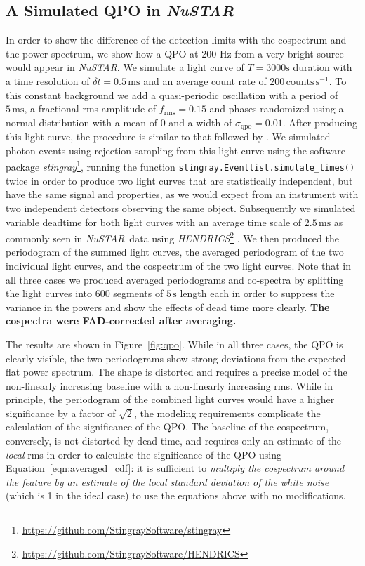 \documentclass[12pt]{emulateapj}
\newcommand{\project}[1]{\textsl{#1}}
\newcommand{\nustar}{\project{NuSTAR}\xspace}
\begin{document}
\subsection{A Simulated QPO in \nustar}

In order to show the difference of the detection limits with the cospectrum and the power spectrum, we show how a QPO at 200 Hz from a very bright source would appear in \nustar. 
We simulate a light curve of $T=3000\mathrm{s}$ duration with a time resolution of $\delta t = 0.5 \,\mathrm{ms}$ and an average count rate of $200 \,\mathrm{counts}\,\mathrm{s}^{-1}$. To this constant background we add a quasi-periodic oscillation with a period of $5\,\mathrm{ms}$, a fractional rms amplitude of $f_\mathrm{rms} = 0.15$ and phases randomized using a normal distribution with a mean of $0$ and a width of $\sigma_\mathrm{qpo} = 0.01$. After producing this light curve, the procedure is similar to that followed by \citet{Bachetti+15}. We simulated photon events using rejection sampling from this light curve using the software package \textit{stingray}\footnote{\url{https://github.com/StingraySoftware/stingray}}, running the function \texttt{stingray.Eventlist.simulate\_times()} twice in order to produce two light curves that are statistically independent, but have the same signal and properties, as we would expect from an instrument with two independent detectors observing the same object. Subsequently we simulated variable deadtime for both light curves with an average time scale of $2.5 \,\mathrm{ms}$ as commonly seen in \nustar\ data \citep{Bachetti+15} using \textit{HENDRICS}\footnote{\url{https://github.com/StingraySoftware/HENDRICS}} \citep{bachetti2015b}. We then produced the periodogram of the summed light curves, the averaged periodogram of the two individual light curves, and the cospectrum of the two light curves. Note that in all three cases we produced averaged periodograms and co-spectra by splitting the light curves into 600 segments of $5\,\mathrm{s}$ length each in order to suppress the variance in the powers and show the effects of dead time more clearly. \textbf{The cospectra were FAD-corrected after averaging.}

The results are shown in Figure~\ref{fig:qpo}. While in all three cases, the QPO is clearly visible, the two periodograms show strong deviations from the expected flat power spectrum. The shape is distorted and requires a precise model of the non-linearly increasing baseline with a non-linearly increasing rms. While in principle, the periodogram of the combined light curves would have a higher significance by a factor of $\sqrt{2}$, the modeling requirements complicate the calculation of the significance of the QPO. 
The baseline of the cospectrum, conversely, is not distorted by dead time, and requires only an estimate of the \textit{local} rms in order to calculate the significance of the QPO using Equation~\ref{eqn:averaged_cdf}: it is sufficient to \textit{multiply the cospectrum around the feature by an estimate of the local standard deviation of the white noise} (which is 1 in the ideal case) to use the equations above with no modifications.
\end{document}
